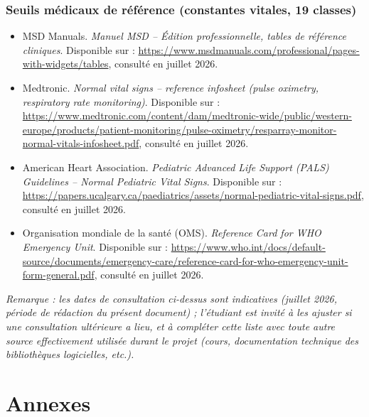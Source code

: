 \documentclass[12pt,a4paper]{report}
\begin{document}
\subsection*{Seuils médicaux de référence (constantes vitales, 19 classes)}
\begin{itemize}
    \item MSD Manuals. \textit{Manuel MSD -- Édition professionnelle, tables de référence cliniques}. Disponible sur : \url{https://www.msdmanuals.com/professional/pages-with-widgets/tables}, consulté en juillet 2026.
    \item Medtronic. \textit{Normal vital signs -- reference infosheet (pulse oximetry, respiratory rate monitoring)}. Disponible sur : \url{https://www.medtronic.com/content/dam/medtronic-wide/public/western-europe/products/patient-monitoring/pulse-oximetry/resparray-monitor-normal-vitals-infosheet.pdf}, consulté en juillet 2026.
    \item American Heart Association. \textit{Pediatric Advanced Life Support (PALS) Guidelines -- Normal Pediatric Vital Signs}. Disponible sur : \url{https://papers.ucalgary.ca/paediatrics/assets/normal-pediatric-vital-signs.pdf}, consulté en juillet 2026.
    \item Organisation mondiale de la santé (OMS). \textit{Reference Card for WHO Emergency Unit}. Disponible sur : \url{https://www.who.int/docs/default-source/documents/emergency-care/reference-card-for-who-emergency-unit-form-general.pdf}, consulté en juillet 2026.
\end{itemize}

\textit{Remarque : les dates de consultation ci-dessus sont indicatives (juillet 2026, période de rédaction du présent document) ; l'étudiant est invité à les ajuster si une consultation ultérieure a lieu, et à compléter cette liste avec toute autre source effectivement utilisée durant le projet (cours, documentation technique des bibliothèques logicielles, etc.).}

\chapter{Annexes}
\end{document}
